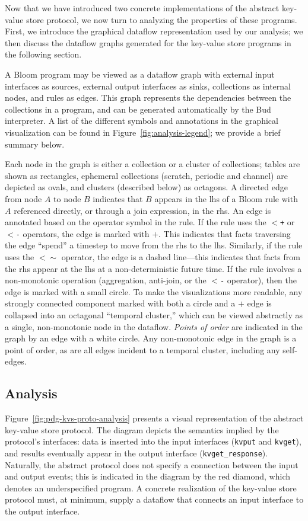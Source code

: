 Now that we have introduced two concrete implementations of the abstract
key-value store protocol, we now turn to analyzing the properties of these
programs. First, we introduce the graphical dataflow representation used by our
analysis; we then discuss the dataflow graphs generated for the key-value store
programs in the following section.

A Bloom program may be viewed as a dataflow graph with external input interfaces
as sources, external output interfaces as sinks, collections as internal nodes,
and rules as edges. This graph represents the dependencies between the
collections in a program, and can be generated automatically by the Bud
interpreter. A list of the different symbols and annotations in the graphical
visualization can be found in Figure~\ref{fig:analysis-legend}; we provide a
brief summary below.

Each node in the graph is either a collection or a cluster of collections;
tables are shown as rectangles, ephemeral collections (scratch, periodic and
channel) are depicted as ovals, and clusters (described below) as octagons. A
directed edge from node $A$ to node $B$ indicates that $B$ appears in the lhs of
a Bloom rule with $A$ referenced directly, or through a join expression, in the
rhs.  An edge is annotated based on the operator symbol in the rule. If the rule
uses the \texttt{$<$+} or \texttt{$<$-} operators, the edge is marked with
$+$. This indicates that facts traversing the edge ``spend'' a timestep to move
from the rhs to the lhs. Similarly, if the rule uses the \texttt{$<\sim$}
operator, the edge is a dashed line---this indicates that facts from the rhs
appear at the lhs at a non-deterministic future time. If the rule involves a
non-monotonic operation (aggregation, anti-join, or the \texttt{$<$-} operator),
then the edge is marked with a small circle.  To make the visualizations more
readable, any strongly connected component marked with both a circle and a $+$
edge is collapsed into an octagonal ``temporal cluster,'' which can be viewed
abstractly as a single, non-monotonic node in the dataflow. \emph{Points of
  order} are indicated in the graph by an edge with a white circle.  Any
non-monotonic edge in the graph is a point of order, as are all edges incident
to a temporal cluster, including any self-edges.

\subsection{Analysis}
Figure~\ref{fig:pdg-kvs-proto-analysis} presents a visual representation of the
abstract key-value store protocol. The diagram depicts the semantics implied by
the protocol's interfaces: data is inserted into the input interfaces
(\texttt{kvput} and \texttt{kvget}), and results eventually appear in the output
interface (\texttt{kvget\_response}). Naturally, the abstract protocol does not
specify a connection between the input and output events; this is indicated in
the diagram by the red diamond, which denotes an underspecified program. A
concrete realization of the key-value store protocol must, at minimum, supply a
dataflow that connects an input interface to the output interface.

